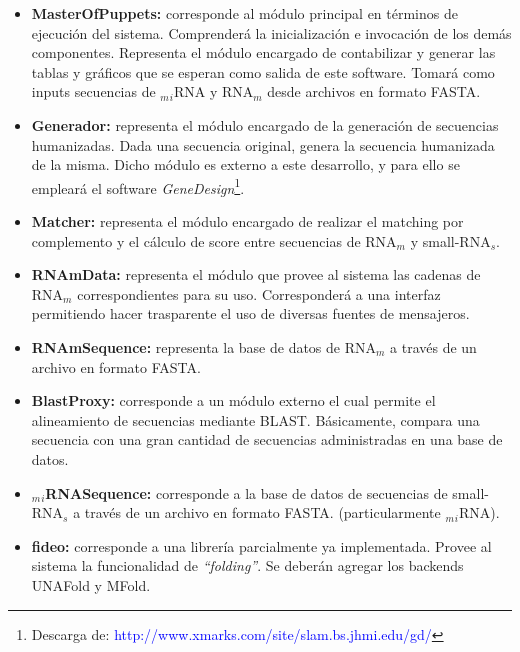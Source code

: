 \documentclass[12pt,a4paper,spanish]{article}
\begin{document}
\begin{itemize}
  \item \textbf{MasterOfPuppets:} corresponde al módulo principal en términos de ejecución del sistema. Comprenderá
  la inicialización e invocación de los demás componentes. Representa el módulo encargado de contabilizar y generar 
  las tablas y gráficos que se esperan como salida de este software. Tomará como inputs secuencias de $_m$$_i$RNA y  
  RNA$_m$ desde archivos en formato FASTA.

  \item \textbf{Generador:} representa el módulo encargado de la generación de secuencias humanizadas. Dada una 		 
  secuencia original, genera la secuencia humanizada de la misma. Dicho módulo es externo a este desarrollo, y para ello  
  se empleará el software \emph{GeneDesign}\footnote{Descarga de: 
  \textcolor{blue}{http://www.xmarks.com/site/slam.bs.jhmi.edu/gd/}}. %

  \item \textbf{Matcher:} representa el módulo encargado de realizar el matching por complemento y el cálculo de score
  entre secuencias de RNA$_m$ y small-RNA$_s$. 

  \item \textbf{RNAmData:} representa el módulo que provee al sistema las cadenas de RNA$_m$ correspondientes para su 	
  uso. Corresponderá a una interfaz permitiendo hacer trasparente el uso de diversas fuentes de mensajeros.

  \item \textbf{RNAmSequence:} representa la base de datos de RNA$_m$ a través de un archivo en formato FASTA.

  \item \textbf{BlastProxy:} corresponde a un módulo externo el cual permite el alineamiento de secuencias mediante BLAST. 	 Básicamente, compara una secuencia con una gran cantidad de secuencias administradas en una base de datos.

  \item \textbf{$_m$$_i$RNASequence:} corresponde a la base de datos de secuencias de small-RNA$_s$ a través de un archivo 	  en formato FASTA. (particularmente $_m$$_i$RNA).

  \item \textbf{fideo:} corresponde a una librería parcialmente ya implementada. Provee al sistema la funcionalidad de 
  \emph{``folding''}. Se deberán agregar los backends \textsf{UNAFold} y \textsf{MFold}.


\end{itemize}
\end{document}
